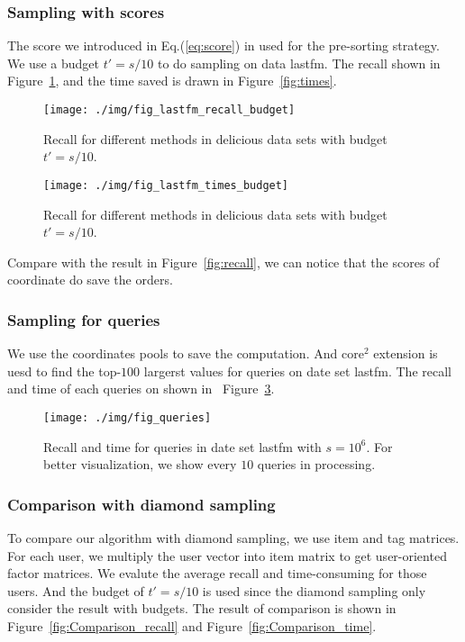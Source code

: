 \documentclass[letterpaper]{article}
\newcommand{\Eqn}[1]   {Eq.(\ref{eq:#1})}
\newcommand{\Fig}[1]   {Figure~\ref{fig:#1}}
\begin{document}
\subsubsection{Sampling with scores}
The score we introduced in \Eqn{score} in used for the pre-sorting strategy.
We use a budget $t' = s/10$ to do sampling on data lastfm.
The recall shown in \Fig{budget}, and the time saved is drawn in \Fig{times}.
\begin{figure}[ht]
  \centering
  \texttt{[image: ./img/fig\_lastfm\_recall\_budget]}\\
  \caption{Recall for different methods in delicious data sets with budget $t'=s/10$.}
  \label{fig:budget}
\end{figure}
\begin{figure}[ht]
  \centering
  \texttt{[image: ./img/fig\_lastfm\_times\_budget]}\\
  \caption{Recall for different methods in delicious data sets with budget $t'=s/10$.}
  \label{fig:time_budget}
\end{figure}
Compare with the result in \Fig{recall}, we can notice that the scores of coordinate
do save the orders.
\subsubsection{Sampling for queries}
We use the coordinates pools to save the computation.
And core$^2$ extension is uesd 
to find the top-$100$ largerst values for queries on date set lastfm.
The recall and time of each queries on shown in ~\Fig{Queries}.
\begin{figure}[ht]
  \centering
  \texttt{[image: ./img/fig\_queries]}\\
  \caption{Recall and time for queries in date set lastfm with $s=10^6$.
           For better visualization,
           we show every $10$ queries in processing.}
  \label{fig:Queries}
\end{figure}
\subsubsection{Comparison with diamond sampling}
To compare our algorithm with diamond sampling, we use item and tag matrices.
For each user, we multiply the user vector into item matrix
to get user-oriented factor matrices.
We evalute the average recall and time-consuming for those users.
And the budget of $t'=s/10$ is used since the diamond sampling only consider the result with budgets.
The result of comparison is shown in \Fig{Comparison_recall} and \Fig{Comparison_time}.
\end{document}
